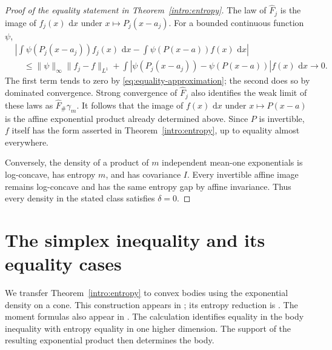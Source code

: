 \documentclass[11pt]{article}
\newcommand{\Dgap}{\delta}
\newcommand{\dd}{\,\mathrm d}
\newcommand{\norm}[1]{\lVert #1\rVert}
\theoremstyle{definition}
\theoremstyle{remark}
\numberwithin{equation}{section}
\begin{document}
\begin{proof}[Proof of the equality statement in Theorem~\ref{intro:entropy}]
The law of $\widehat F_j$ is the image of $f_j(x)\,\dd x$ under
$x\mapsto P_j(x-a_j)$.  For a bounded continuous function $\psi$,
\begin{align*}
 &\left|\int\psi(P_j(x-a_j))f_j(x)\,\dd x
       -\int\psi(P(x-a))f(x)\,\dd x\right|\\
 &\quad\le\norm{\psi}_{\infty}\norm{f_j-f}_{L^1}
     +\int\left|\psi(P_j(x-a_j))-\psi(P(x-a))\right|f(x)\,\dd x
     \longrightarrow0.
\end{align*}
The first term tends to zero by \eqref{eq:equality-approximation};
the second does so by dominated convergence.  Strong convergence of
$\widehat F_j$ also identifies the weak limit of these laws as
$\widehat F_\#\gamma_m$.  It follows that the image of $f(x)\,\dd x$
under $x\mapsto P(x-a)$ is the affine exponential product already
determined above.  Since $P$ is invertible, $f$ itself has the form
asserted in Theorem~\ref{intro:entropy}, up to equality almost everywhere.

Conversely, the density of a product of $m$ independent mean-one
exponentials is log-concave, has entropy $m$, and has covariance $I$.
Every invertible affine image remains log-concave and has the same
entropy gap by affine invariance.  Thus every density in the stated
class satisfies $\Dgap=0$.
\end{proof}

\section{The simplex inequality and its equality cases}\label{sec:geometry}

We transfer Theorem~\ref{intro:entropy} to convex bodies using the exponential
density on a cone. This construction appears in
\cite[Proposition~2(b)]{FradeliziMeyer2008}; its entropy reduction is
\cite[Lemma~5.2 and Proposition~5.2]{FradeliziMarinSola2026}.
The moment formulas also appear in \cite[Lemma~2.5]{Klartag2018}.
The calculation identifies equality in the body inequality with entropy
equality in one higher dimension.  The support of the resulting
exponential product then determines the body.
\end{document}
